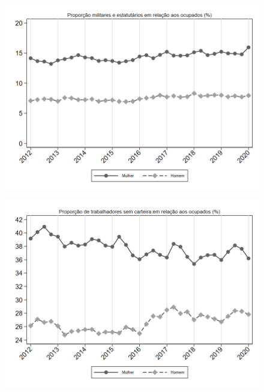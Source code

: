\begin{frame}[label=_composicao_demografica_genero_prop_militar]{}
\textit{\hyperlink{_composicao_demografica_genero}{}}
\begin{figure}
  \centering
  \includegraphics[width=1.0\linewidth]{../../analysis/output/composicao_demografica/genero/_composicao_demografica_genero_prop_militar.png}
  \caption{}
  \label{fig:_composicao_demografica_genero_prop_militar}
\end{figure}
\end{frame}


\begin{frame}[label=_composicao_demografica_genero_prop_empregadoSC]{}
\textit{\hyperlink{_composicao_demografica_genero}{}}
\begin{figure}
  \centering
  \includegraphics[width=1.0\linewidth]{../../analysis/output/composicao_demografica/genero/_composicao_demografica_genero_prop_empregadoSC.png}
  \caption{}
  \label{fig:_composicao_demografica_genero_prop_empregadoSC}
\end{figure}
\end{frame}

